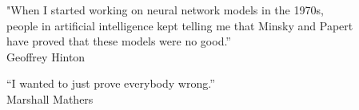 \thispagestyle{empty}
\begin{flushright}

\vspace*{60mm}

"When I started working on neural network models in the 1970s,\\
people in artificial intelligence kept telling me that Minsky and Papert\\
have proved that these models were no good.”\\
\vspace{4mm}
\hfill Geoffrey Hinton\\

\vspace*{40mm}

“I wanted to just prove everybody wrong.”\\
\vspace{4mm}
\hfill Marshall Mathers\\



\end{flushright}